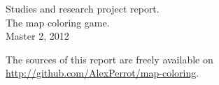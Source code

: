 \documentclass[a4paper, oneside, 10pt]{book}
\begin{document}
\backmatter

\nocite{*}



\listoffigures



\newpage
\pagestyle{empty}

Studies and research project report.\\
The map coloring game.\\
Master 2, 2012

\vfill

The sources of this report are freely available on \url{http://github.com/AlexPerrot/map-coloring}.

\bigskip

\end{document}

